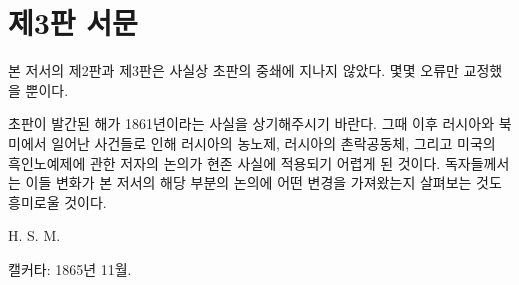 \chapter*{제3판 서문}

본 저서의 제2판과 제3판은
사실상 초판의 중쇄에 지나지 않았다.
몇몇 오류만 교정했을 뿐이다.

초판이 발간된 해가 1861년이라는 사실을 상기해주시기 바란다.
그때 이후 러시아와 북미에서 일어난 사건들로 인해
러시아의 농노제, 러시아의 촌락공동체,
그리고 미국의 흑인노예제에 관한 저자의 논의가
현존 사실에 적용되기 어렵게 된 것이다.
독자들께서는
이들 변화가 본 저서의 해당 부분의 논의에 어떤 변경을 가져왔는지
살펴보는 것도 흥미로울 것이다.

\begin{flushright}
H. S. M.
\end{flushright}

\begin{footnotesize}
캘커타: 1865년 11월.
\end{footnotesize}


